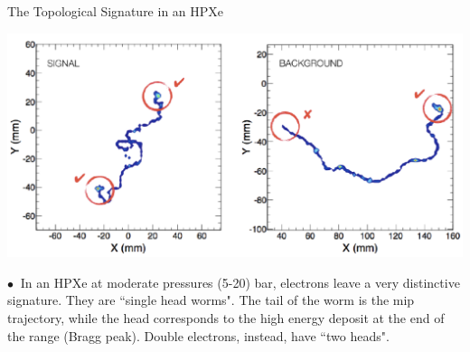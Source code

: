 \documentclass [aspectratio=169]{beamer}
\newcommand{\qbb}{\ensuremath{Q_{\beta\beta}}}
\begin{document}
\begin{frame}{The Topological Signature in an HPXe }

\includegraphics[scale=0.25]{idealtopo.png}


$\bullet~$ In an HPXe at moderate pressures (5-20) bar, electrons leave a very distinctive signature. They are ``single head worms". The tail of the worm is the mip trajectory, while the head corresponds to the high energy deposit at the end of the range (Bragg peak). Double electrons, instead, have ``two heads".  


\end{frame}
\end{document}
